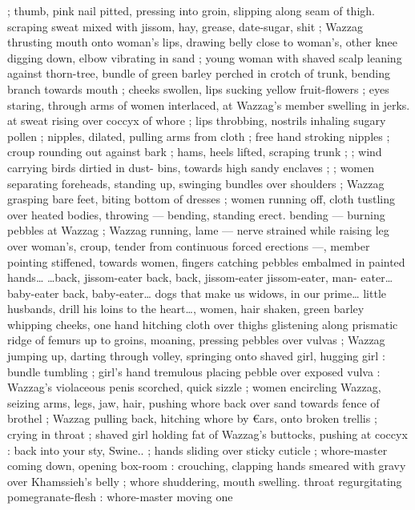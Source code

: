 ; thumb, pink nail pitted, pressing into groin, slipping along seam of 
thigh. scraping sweat mixed with jissom, hay, grease, date-sugar, shit 
; Wazzag thrusting mouth onto woman's lips, drawing belly close to 
woman's, other knee digging down, elbow vibrating in sand ; young 
woman with shaved scalp leaning against thorn-tree, bundle of green 
barley perched in crotch of trunk, bending branch towards mouth ; 
cheeks swollen, lips sucking yellow fruit-flowers ; eyes staring, 
through arms of women interlaced, at Wazzag's member swelling in 
jerks. at sweat rising over coccyx of whore ; lips throbbing, nostrils 
inhaling sugary pollen ; nipples, dilated, pulling arms from cloth ; 
free hand stroking nipples ; croup rounding out against bark ; hams, 
heels lifted, scraping trunk ; ; wind carrying birds dirtied in dust- 
bins, towards high sandy enclaves ; ; women separating foreheads, 
standing up, swinging bundles over shoulders ; Wazzag grasping 
bare feet, biting bottom of dresses ; women running off, cloth 
tustling over heated bodies, throwing --- bending, standing erect. 
bending --- burning pebbles at Wazzag ; Wazzag running, lame --- 
nerve strained while raising leg over woman's, croup, tender from 
continuous forced erections ---, member pointing stiffened, towards 
women, fingers catching pebbles embalmed in painted hands{\ldots} 
{\gl}{\ldots}back, jissom-eater{\td} back, back, jissom-eater{\td} jissom-eater, man- 
eater{\ldots} baby-eater{\td} back, baby-eater{\ldots} dogs that make us widows, in 
our prime{\ldots} little husbands, drill his loins to the heart{\ldots}{\gr}, women, 
hair shaken, green barley whipping cheeks, one hand hitching cloth 
over thighs glistening along prismatic ridge of femurs up to groins, 
moaning, pressing pebbles over vulvas ; Wazzag jumping up, darting 
through volley, springing onto shaved girl, hugging girl : bundle 
tumbling ; girl's hand tremulous placing pebble over exposed vulva : 
Wazzag's violaceous penis scorched, quick sizzle ; women encircling 
Wazzag, seizing arms, legs, jaw, hair, pushing whore back over sand 
towards fence of brothel ; Wazzag pulling back, hitching whore by 
€ars, onto broken trellis ; crying in throat ; shaved girl holding fat of 
Wazzag's buttocks, pushing at coccyx : {\td} {\gl}{\td} back into your sty, 
Swine..{\gr} ; hands sliding over sticky cuticle ; whore-master coming 
down, opening box-room : crouching, clapping hands smeared with 
gravy over Khamssieh's belly ; whore shuddering, mouth swelling. 
throat regurgitating pomegranate-flesh : whore-master moving one 
